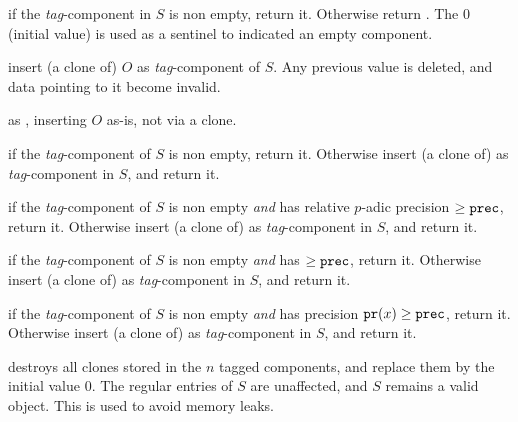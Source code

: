  if the \emph{tag}-component in $S$
is non empty, return it. Otherwise return . The  $0$
(initial value) is used as a sentinel to indicated an empty component.

 insert (a clone of) $O$
as \emph{tag}-component of $S$. Any previous value is deleted, and
data pointing to it become invalid.

 as ,
inserting $O$ as-is, not via a clone.

 if the
\emph{tag}-component of $S$ is non empty, return it. Otherwise insert
(a clone of)  as \emph{tag}-component in $S$, and return it.

if the \emph{tag}-component of $S$ is non empty \emph{and} has relative
$p$-adic precision $\geq {\tt prec}$, return it. Otherwise insert (a clone
of)  as \emph{tag}-component in $S$, and return it.

 if the \emph{tag}-component of $S$ is non empty \emph{and} has
 $\geq {\tt prec}$, return it. Otherwise insert (a clone of)
 as \emph{tag}-component in $S$, and return it.

 if the \emph{tag}-component of $S$ is non empty
\emph{and} has precision ${\tt pr}(x)\geq {\tt prec}$, return it. Otherwise
insert (a clone of)  as \emph{tag}-component in $S$,
and return it.

 destroys all clones stored in the $n$ tagged
components, and replace them by the initial value $0$. The regular entries of
$S$ are unaffected, and $S$ remains a valid object. This is used to
avoid memory leaks.

